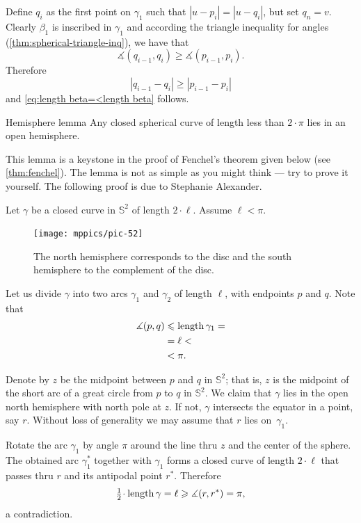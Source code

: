 Define $q_i$ as the first point on $\gamma_1$ such that $|u-p_i|=|u-q_i|$, but set $q_n=v$.
Clearly $\beta_1$ is inscribed in $\gamma_1$ and according the triangle inequality for angles (\ref{thm:spherical-triangle-inq}), we have that 
\[ \measuredangle(q_{i-1},q_i)\ge\measuredangle(p_{i-1},p_i).\]
Therefore 
\[ |q_{i-1}-q_i|\ge|p_{i-1}-p_i|\]
and \ref{eq:length beta=<length beta} follows.
\qeds

\begin{thm}{Hemisphere lemma}\label{lem:hemisphere}
Any closed spherical curve of length less than $2\cdot \pi$ lies in an open hemisphere. 
\end{thm}

This lemma is a keystone in the proof of Fenchel's theorem given below (see \ref{thm:fenchel}).
The lemma is not as simple as you might think --- try to prove it yourself.
The following proof is due to Stephanie Alexander.

Let $\gamma$ be a closed curve in $\mathbb{S}^2$ of length $2\cdot\ell$.
Assume $\ell<\pi$.

{

\begin{figure}
\vskip-0mm
\centering
\texttt{[image: mppics/pic-52]}
\caption*{The north hemisphere corresponds to the disc and the south hemisphere to the complement of the disc.}
\end{figure} %

Let us divide $\gamma$ into two arcs $\gamma_1$ and $\gamma_2$ of length $\ell$, with endpoints $p$ and $q$. 
Note that 
\begin{align*}
\measuredangle(p,q)&\leqslant \mathop{\rm length}\nolimits \gamma_1=
\\
&= \ell<
\\
&<\pi.
\end{align*}

Denote by $z$ be the midpoint between $p$ and $q$ in $\mathbb{S}^2$;
that is, $z$ is the midpoint of the short arc of a great circle from $p$ to $q$ in $\mathbb{S}^2$. 
We claim that $\gamma$ lies in the open north hemisphere with north pole at $z$.  
If not, $\gamma$ intersects the equator in a point, say $r$.
Without loss of generality we may assume that $r$ lies on~$\gamma_1$. 

}

Rotate the arc $\gamma_1$ by angle $\pi$ around the line thru $z$ and the center of the sphere.
The obtained arc $\gamma_1^{*}$ together with $\gamma_1$ forms a closed curve of length $2\cdot \ell$ that passes thru $r$ and its antipodal point $r^{*}$.
Therefore
\[\tfrac12\cdot\length \gamma=\ell\ge \measuredangle(r,r^{*})=\pi,\] 
a contradiction.
\qeds

